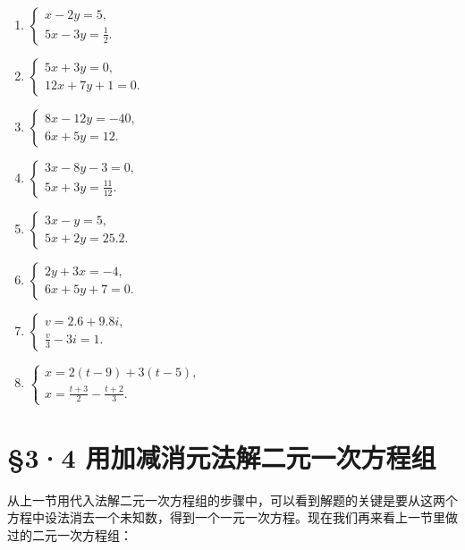 \begin{enumerate}[start=6]
\item
  \(\left\{ \begin{array}{l} x - 2y = 5, \\ 5x - 3y = \frac{1}{2}. \end{array} \right.\)
\item
  \(\left\{ \begin{array}{l} 5x + 3y = 0, \\ 12x + 7y + 1 = 0. \end{array} \right.\)
\item
  \(\left\{ \begin{array}{l} 8x - 12y = -40, \\ 6x + 5y = 12. \end{array} \right.\)
\item
  \(\left\{ \begin{array}{l} 3x - 8y - 3 = 0, \\ 5x + 3y = \frac{11}{12}. \end{array} \right.\)
\item
  \(\left\{ \begin{array}{l} 3x - y = 5, \\ 5x + 2y = 25.2. \end{array} \right.\)
\item
  \(\left\{ \begin{array}{l} 2y + 3x = -4, \\ 6x + 5y + 7 = 0. \end{array} \right.\)
\item
  \(\left\{ \begin{array}{l} v = 2.6 + 9.8i, \\ \frac{v}{3} - 3i = 1. \end{array} \right.\)
\item
  \(\left\{ \begin{array}{l} x = 2(t - 9) + 3(t - 5), \\ x = \frac{t + 3}{2} - \frac{t + 2}{3}. \end{array} \right.\)
\end{enumerate}

\section{§3·4 用加减消元法解二元一次方程组}

从上一节用代入法解二元一次方程组的步骤中，可以看到解题的关键是要从这两个方程中设法消去一个未知数，得到一个一元一次方程。现在我们再来看上一节里做过的二元一次方程组：

